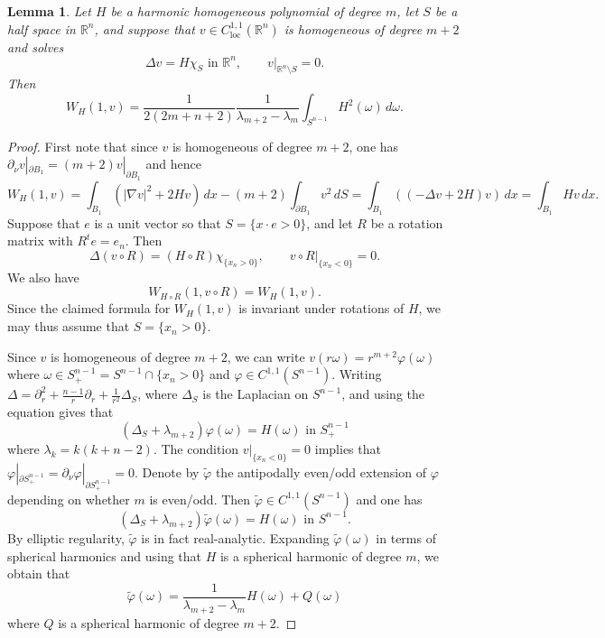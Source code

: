 \documentclass[11pt,a4paper]{amsart}
\newtheorem{Lemma}[Theorem]{Lemma}
\theoremstyle{definition}
\numberwithin{equation}{section}
\newcommand{\mR}{\mathbb{R}}                    %
\newcommand{\abs}[1]{\lvert #1 \rvert}          %
\newcommand{\p}{\partial}
\begin{document}
\begin{Lemma} \label{lemma_halfspace_weiss_energy}
Let $H$ be a harmonic homogeneous polynomial of degree $m$, let $S$ be a half space in $\mR^n$, and suppose that $v \in C^{1,1}_{\mathrm{loc}}(\mR^n)$ is homogeneous of degree $m+2$ and solves 
\[
\Delta v = H \chi_S \text{ in $\mR^n$}, \qquad v|_{\mR^n \setminus S} = 0.
\]
Then 
\[
W_H(1, v) = \frac{1}{2(2m+n+2)} \frac{1}{\lambda_{m+2}-\lambda_m} \int_{S^{n-1}} H^2(\omega) \,d\omega.
\]
\end{Lemma}
\begin{proof}

First note that since $v$ is homogeneous of degree $m+2$, one has $\p_{\nu} v|_{\p B_1} = (m+2)v|_{\p B_1}$ and hence 
\[
W_H(1,v) = \int_{B_1} (\abs{\nabla v}^2 + 2Hv) \,dx - (m+2) \int_{\p B_1} v^2 \,dS = \int_{B_1} ((-\Delta v + 2H) v) \,dx = \int_{B_1} H v \,dx.
\]
Suppose that $e$ is a unit vector so that $S = \{ x \cdot e > 0 \}$, and let $R$ be a rotation matrix with $R^t e = e_n$. Then 
\[
\Delta(v \circ R) = (H \circ R) \chi_{\{ x_n > 0 \}}, \qquad v \circ R|_{\{x_n < 0\}} = 0.
\]
We also have 
\[
W_{H \circ R}(1, v \circ R) = W_H(1,v).
\]
Since the claimed formula for $W_H(1,v)$ is invariant under rotations of $H$, we may thus assume that $S = \{ x_n > 0 \}$.

Since $v$ is homogeneous of degree $m+2$, we can write $v(r\omega) = r^{m+2} \varphi(\omega)$ where $\omega \in S^{n-1}_+ = S^{n-1} \cap \{ x_n > 0 \}$ and $\varphi \in C^{1,1}(S^{n-1})$. Writing $\Delta = \p_r^2 + \frac{n-1}{r} \p_r + \frac{1}{r^2} \Delta_{S}$, where $\Delta_S$ is the Laplacian on $S^{n-1}$, and using the equation gives that 
\[
(\Delta_S + \lambda_{m+2}) \varphi(\omega) = H(\omega) \text{ in $S^{n-1}_+$}
\] 
where $\lambda_k = k(k+n-2)$. The condition $v|_{\{x_n < 0\}} = 0$ implies that $\varphi|_{\p S^{n-1}_+} = \p_{\nu} \varphi|_{\p S^{n-1}_+} = 0$. Denote by $\tilde{\varphi}$ the antipodally even/odd extension of $\varphi$ depending on whether $m$ is even/odd. Then $\tilde{\varphi} \in C^{1,1}(S^{n-1})$ and one has 
\[
(\Delta_S + \lambda_{m+2}) \tilde{\varphi}(\omega) = H(\omega) \text{ in $S^{n-1}$.}
\]
By elliptic regularity, $\tilde{\varphi}$ is in fact real-analytic. Expanding $\tilde{\varphi}(\omega)$ in terms of spherical harmonics and using that $H$ is a spherical harmonic of degree $m$, we obtain that 
\begin{equation} \label{varphitilde_formula}
\tilde{\varphi}(\omega) = \frac{1}{\lambda_{m+2}-\lambda_m} H(\omega) + Q(\omega)
\end{equation}
where $Q$ is a spherical harmonic of degree $m+2$.


\end{proof}
\end{document}
